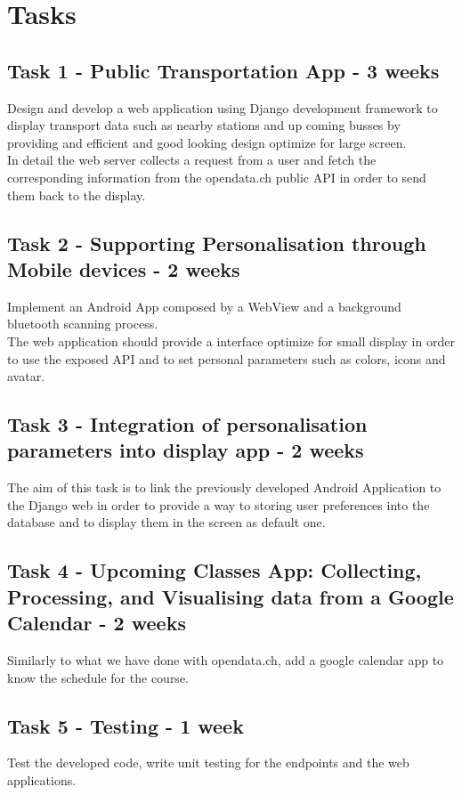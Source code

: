 \documentclass[11pt]{report}
\begin{document}
\section*{Tasks}
\subsection*{Task 1 - Public Transportation App - 3 weeks}
Design and develop a web application using Django development framework to display transport data such as nearby stations and up coming busses by providing and efficient and good looking design optimize for large screen.\\

In detail the web server collects a request from a user and fetch the corresponding information from the opendata.ch public API in order to send them back to the display. 

\subsection*{Task 2 - Supporting Personalisation through Mobile devices - 2 weeks}
Implement an Android App composed by a WebView and a background bluetooth scanning process. 
\\

The web application should provide a interface optimize for small display in order to use the exposed API and to set personal parameters such as colors, icons and avatar.

\subsection*{Task 3 - Integration of personalisation parameters into display app - 2 weeks}
The aim of this task is to link the previously developed Android Application to the Django web in order to provide a way to storing user preferences into the database and to display them in the screen as default one.
\subsection*{Task 4 - Upcoming Classes App: Collecting, Processing, and Visualising data from a Google Calendar - 2 weeks}
Similarly to what we have done with opendata.ch, add a google calendar app to know the schedule for the course.

\subsection*{Task 5 - Testing - 1 week}
Test the developed code, write unit testing for the endpoints and the web applications.
\end{document}
